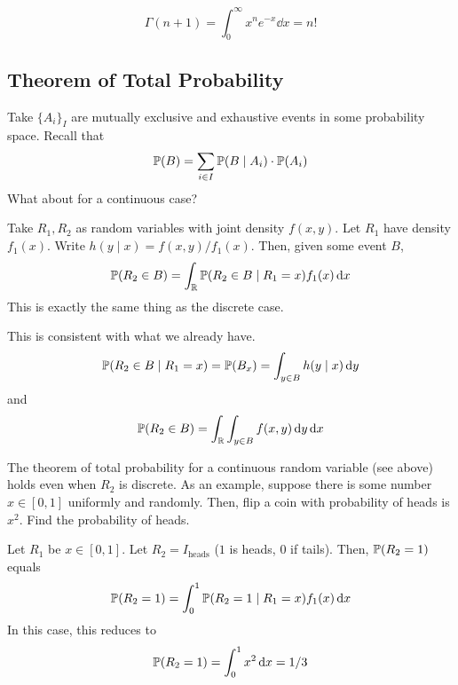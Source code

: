 \begin{aside}
    $$\Gamma(n+1) = \int_0^\infty x^n e^{-x} \dd{x} = n!$$
\end{aside}

\subsection{Theorem of Total Probability}
Take $\{ A_i \}_I$ are mutually exclusive and exhaustive events in some probability space. Recall that
\begin{align}
    \mathbb{P}(B) = \sum_{i \in I} \mathbb{P}(B \mid A_i) \cdot \mathbb{P}(A_i)
\end{align}
What about for a continuous case?
\begin{definition}
    Take $R_1,R_2$ as random variables with joint density $f(x,y)$. Let $R_1$ have density $f_1(x)$. Write $h(y \mid x) = f(x,y)/f_1(x)$. Then, given some event $B$,
    \begin{align}
        \mathbb{P}(R_2 \in B) = \int_{\mathbb{R}} \mathbb{P}(R_2 \in B \mid R_1 = x) f_1(x) \dd{x}
    \end{align}
    This is exactly the same thing as the discrete case.
\end{definition}
This is consistent with what we already have.
\begin{align}
    \mathbb{P}(R_2 \in B \mid R_1 = x) = \mathbb{P}(B_x) = \int_{y \in B} h(y \mid x) \dd{y}
\end{align}
and
\begin{align}
    \mathbb{P}(R_2 \in B) = \int_{\mathbb{R}} \int_{y \in B} f(x,y) \dd{y} \dd{x}
\end{align}
\begin{aside}
    The theorem of total probability for a continuous random variable (see above) holds even when $R_2$ is discrete. As an example, suppose there is some number $x \in [0, 1]$ uniformly and randomly. Then, flip a coin with probability of heads is $x^2$. Find the probability of heads.
\end{aside}
\begin{solution}
    Let $R_1$ be $x \in [0,1]$. Let $R_2 = I_\text{heads}$ ($1$ is heads, $0$ if tails). Then, $\mathbb{P}(R_2 = 1)$ equals
    \begin{align}
        \mathbb{P}(R_2 = 1) = \int_0^1 \mathbb{P}(R_2 = 1 \mid R_1 = x) f_1(x) \dd{x}
    \end{align}
    In this case, this reduces to
    \begin{align}
        \mathbb{P}(R_2 = 1) = \int_0^1 x^2 \dd{x} = 1/3
    \end{align}
\end{solution}

